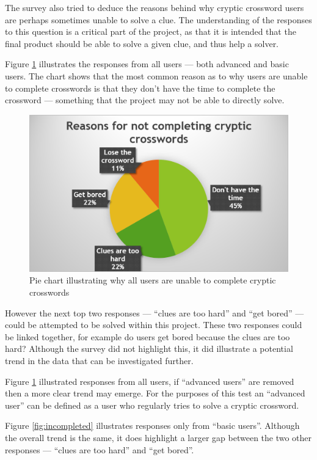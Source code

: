 The survey also tried to deduce the reasons behind why cryptic crossword users 
are perhaps sometimes unable to solve a clue. The understanding of the responses
to this question is a critical part of the project, as that it is intended that
the final product should be able to solve a given clue, and thus help a solver.

Figure \ref{fig:incomplete} illustrates the responses from all users --- both 
advanced and basic users. The chart shows that the most common reason as to why
users are unable to complete crosswords is that they don't have the time to 
complete the crossword --- something that the project may not be able to 
directly solve.

\begin{figure}[H]
  \centering
  \includegraphics[scale=0.9]{graphs/incomplete.png}
  \caption{Pie chart illustrating why all users are unable to complete cryptic 
          crosswords}
  \label{fig:incomplete}
\end{figure}

However the next top two responses --- ``clues are too hard'' and ``get bored'' 
--- could be attempted to be solved within this project. These two responses 
could be linked together, for example do users get bored because the clues are 
too hard? Although the survey did not highlight this, it did illustrate a 
potential trend in the data that can be investigated further.

Figure \ref{fig:incomplete} illustrated responses from all users, if 
``advanced users'' are removed then a more clear trend may emerge. For the 
purposes of this test an ``advanced user'' can be defined as a user who 
regularly tries to solve a cryptic crossword.

Figure \ref{fig:incompleted} illustrates responses only from ``basic users''. 
Although the overall trend is the same, it does highlight a larger gap between 
the two other responses --- ``clues are too hard'' and ``get bored''. 

